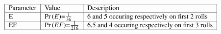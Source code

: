 \begin{align}
    \begin{tabular}{|l|l|l|}\hline
        Parameter & Value & Description\\\hline
        E	    &\pr{E}=$\frac{1}{36}$  &6 and 5 occuring respectively on first 2 rolls\\\hline
        EF	&\pr{EF}=$\frac{1}{216}$ &6,5 and 4 occuring respectively on first 3 rolls\\\hline
        \end{tabular}
    \end{align}
